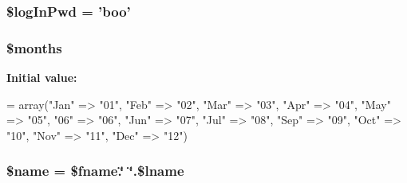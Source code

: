 \hypertarget{_m_c_mcreate_new_account_validator_8php_a1c091e7fa854daecefe6889e0cb8975e}{
\subsubsection[{\$log\-In\-Pwd}]{\setlength{\rightskip}{0pt plus 5cm}\$log\-In\-Pwd = 'boo'}}\label{_m_c_mcreate_new_account_validator_8php_a1c091e7fa854daecefe6889e0cb8975e}
\hypertarget{_m_c_mcreate_new_account_validator_8php_a88a8980708982166840708b055e335b8}{
\subsubsection[{\$months}]{\setlength{\rightskip}{0pt plus 5cm}\$months}}\label{_m_c_mcreate_new_account_validator_8php_a88a8980708982166840708b055e335b8}
{\bfseries Initial value\-:}
\begin{DoxyCode}
= array(\textcolor{stringliteral}{"Jan"} => \textcolor{stringliteral}{"01"},
                    \textcolor{stringliteral}{"Feb"} => \textcolor{stringliteral}{"02"},
                    \textcolor{stringliteral}{"Mar"} => \textcolor{stringliteral}{"03"},
                    \textcolor{stringliteral}{"Apr"} => \textcolor{stringliteral}{"04"},
                    \textcolor{stringliteral}{"May"} => \textcolor{stringliteral}{"05"},
                    \textcolor{stringliteral}{"06"} => \textcolor{stringliteral}{"06"},
                    \textcolor{stringliteral}{"Jun"} => \textcolor{stringliteral}{"07"},
                    \textcolor{stringliteral}{"Jul"} => \textcolor{stringliteral}{"08"},
                    \textcolor{stringliteral}{"Sep"} => \textcolor{stringliteral}{"09"},
                    \textcolor{stringliteral}{"Oct"} => \textcolor{stringliteral}{"10"},
                    \textcolor{stringliteral}{"Nov"} => \textcolor{stringliteral}{"11"},
                    \textcolor{stringliteral}{"Dec"} => \textcolor{stringliteral}{"12"})
\end{DoxyCode}
\hypertarget{_m_c_mcreate_new_account_validator_8php_ab2fc40d43824ea3e1ce5d86dee0d763b}{
\subsubsection[{\$name}]{\setlength{\rightskip}{0pt plus 5cm}\$name = \$fname.\char`\"{} \char`\"{}.\$lname}}\label{_m_c_mcreate_new_account_validator_8php_ab2fc40d43824ea3e1ce5d86dee0d763b}
